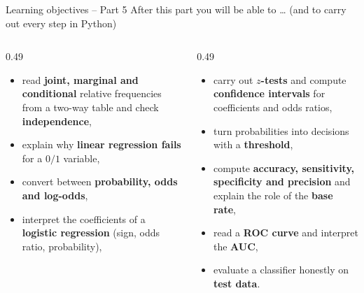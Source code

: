 \documentclass[aspectratio=169,11pt]{beamer}
\begin{document}
\begin{frame}{Learning objectives -- Part 5}
  After this part you will be able to \ldots{} (and to carry out every step
  in Python)
  \begin{columns}[T]
    \begin{column}{0.49\textwidth}
      \small\begin{itemize}\setlength{\itemsep}{0pt}
        \item read \textbf{joint, marginal and conditional} relative
              frequencies from a two-way table and check
              \textbf{independence},
        \item explain why \textbf{linear regression fails} for a $0/1$
              variable,
        \item convert between \textbf{probability, odds and log-odds},
        \item interpret the coefficients of a \textbf{logistic regression}
              (sign, odds ratio, probability),
      \end{itemize}
    \end{column}
    \begin{column}{0.49\textwidth}
      \small\begin{itemize}\setlength{\itemsep}{0pt}
        \item carry out \textbf{$z$-tests} and compute \textbf{confidence
              intervals} for coefficients and odds ratios,
        \item turn probabilities into decisions with a \textbf{threshold},
        \item compute \textbf{accuracy, sensitivity, specificity and
              precision} and explain the role of the \textbf{base rate},
        \item read a \textbf{ROC curve} and interpret the \textbf{AUC},
        \item evaluate a classifier honestly on \textbf{test data}.
      \end{itemize}
    \end{column}
  \end{columns}
\end{frame}
\end{document}
